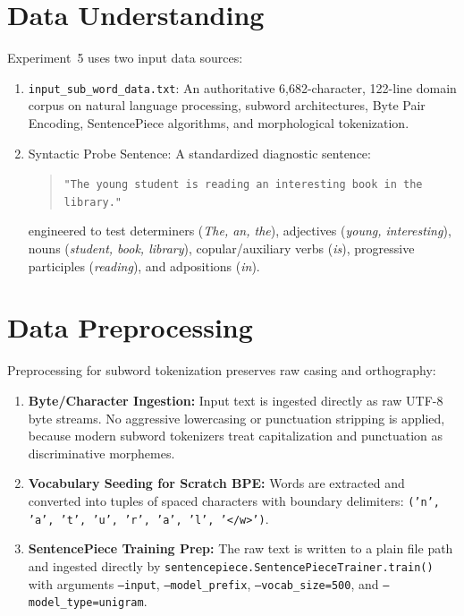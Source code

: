 \documentclass[12pt,a4paper]{report}
\begin{document}
\section{Data Understanding}
Experiment~5 uses two input data sources:
\begin{enumerate}
    \item \texttt{input\_sub\_word\_data.txt}: An authoritative 6,682-character, 122-line domain corpus on natural language processing, subword architectures, Byte Pair Encoding, SentencePiece algorithms, and morphological tokenization.
    \item Syntactic Probe Sentence: A standardized diagnostic sentence:
    \begin{quote}
    \texttt{"The young student is reading an interesting book in the library."}
    \end{quote}
    engineered to test determiners (\textit{The, an, the}), adjectives (\textit{young, interesting}), nouns (\textit{student, book, library}), copular/auxiliary verbs (\textit{is}), progressive participles (\textit{reading}), and adpositions (\textit{in}).
\end{enumerate}

\section{Data Preprocessing}
Preprocessing for subword tokenization preserves raw casing and orthography:
\begin{enumerate}
    \item \textbf{Byte/Character Ingestion:} Input text is ingested directly as raw UTF-8 byte streams. No aggressive lowercasing or punctuation stripping is applied, because modern subword tokenizers treat capitalization and punctuation as discriminative morphemes.
    \item \textbf{Vocabulary Seeding for Scratch BPE:} Words are extracted and converted into tuples of spaced characters with boundary delimiters: \texttt{('n', 'a', 't', 'u', 'r', 'a', 'l', '</w>')}.
    \item \textbf{SentencePiece Training Prep:} The raw text is written to a plain file path and ingested directly by \texttt{sentencepiece.SentencePieceTrainer.train()} with arguments \texttt{--input}, \texttt{--model\_prefix}, \texttt{--vocab\_size=500}, and \texttt{--model\_type=unigram}.
\end{enumerate}
\end{document}
